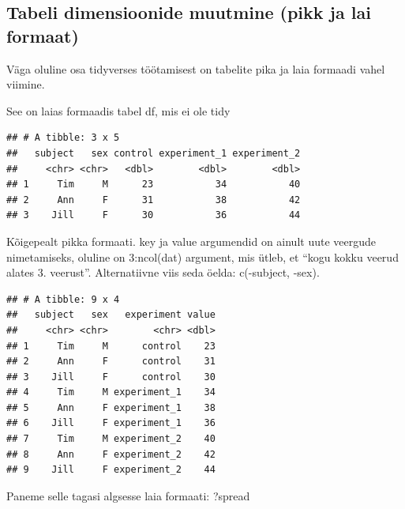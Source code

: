 \documentclass[]{book}
\newenvironment{Shaded}{\begin{snugshade}}{\end{snugshade}}
\newcommand{\KeywordTok}[1]{\textcolor[rgb]{0.13,0.29,0.53}{\textbf{#1}}}
\newcommand{\DataTypeTok}[1]{\textcolor[rgb]{0.13,0.29,0.53}{#1}}
\newcommand{\DecValTok}[1]{\textcolor[rgb]{0.00,0.00,0.81}{#1}}
\newcommand{\StringTok}[1]{\textcolor[rgb]{0.31,0.60,0.02}{#1}}
\newcommand{\CommentTok}[1]{\textcolor[rgb]{0.56,0.35,0.01}{\textit{#1}}}
\newcommand{\OperatorTok}[1]{\textcolor[rgb]{0.81,0.36,0.00}{\textbf{#1}}}
\newcommand{\NormalTok}[1]{#1}
\begin{document}
\subsection{Tabeli dimensioonide muutmine (pikk ja lai
formaat)}\label{tabeli-dimensioonide-muutmine-pikk-ja-lai-formaat}

Väga oluline osa tidyverses töötamisest on tabelite pika ja laia
formaadi vahel viimine.

See on laias formaadis tabel df, mis ei ole tidy

\begin{verbatim}
## # A tibble: 3 x 5
##   subject   sex control experiment_1 experiment_2
##     <chr> <chr>   <dbl>        <dbl>        <dbl>
## 1     Tim     M      23           34           40
## 2     Ann     F      31           38           42
## 3    Jill     F      30           36           44
\end{verbatim}

Kõigepealt pikka formaati. key ja value argumendid on ainult uute
veergude nimetamiseks, oluline on 3:ncol(dat) argument, mis ütleb, et
``kogu kokku veerud alates 3. veerust''. Alternatiivne viis seda öelda:
c(-subject, -sex).

\begin{Shaded}
\end{Shaded}

\begin{verbatim}
## # A tibble: 9 x 4
##   subject   sex   experiment value
##     <chr> <chr>        <chr> <dbl>
## 1     Tim     M      control    23
## 2     Ann     F      control    31
## 3    Jill     F      control    30
## 4     Tim     M experiment_1    34
## 5     Ann     F experiment_1    38
## 6    Jill     F experiment_1    36
## 7     Tim     M experiment_2    40
## 8     Ann     F experiment_2    42
## 9    Jill     F experiment_2    44
\end{verbatim}

Paneme selle tagasi algsesse laia formaati: ?spread
\end{document}
